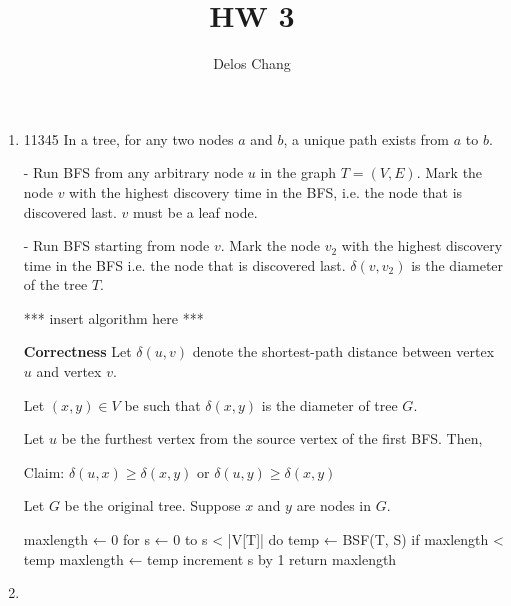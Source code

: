 \documentclass[a4paper]{report}
\title{HW 3}
\author{Delos Chang}
\date{}
\begin{document}
  \begin{enumerate}
    \item
      11345
      In a tree, for any two nodes $a$ and $b$, a unique path exists from $a$ to $b$.

      - Run BFS from any arbitrary node $u$ in the graph $T=(V,E)$. Mark the node $v$ with the highest discovery time in the BFS, 
      i.e. the node that is discovered last. $v$ must be a leaf node. 

      - Run BFS starting from node $v$. Mark the node $v_2$ with the highest discovery time in the BFS i.e. the node that is discovered last. 
      $\delta(v,v_2)$ is the diameter of the tree $T$. 

      *** insert algorithm here ***

      {\bf Correctness}
      Let $\delta(u,v)$ denote the shortest-path distance between vertex $u$ and vertex $v$.

      Let $(x,y) \in V$ be such that $\delta(x,y)$ is the diameter of tree $G$.

      Let $u$ be the furthest vertex from the source vertex of the first BFS. Then, 

      Claim: $\delta(u,x) \geq \delta(x,y)$ or $\delta(u,y) \geq \delta(x,y)$




      Let $G$ be the original tree. Suppose $x$ and $y$ are nodes in $G$. 

      maxlength ← 0
for s ← 0 to s < |V[T]|
      do temp ← BSF(T, S)
            if maxlength < temp
                   maxlength ← temp
                   increment s by 1
return maxlength




    \par
    \bigskip

    \item
\end{enumerate}
\end{document}
